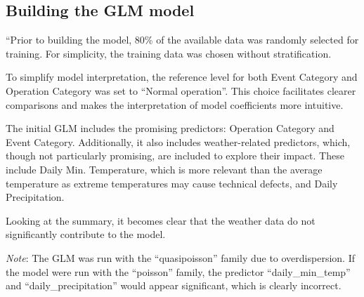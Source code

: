 \documentclass[
]{article}
\newenvironment{Shaded}{\begin{snugshade}}{\end{snugshade}}
\newcommand{\AttributeTok}[1]{\textcolor[rgb]{0.13,0.29,0.53}{#1}}
\newcommand{\CommentTok}[1]{\textcolor[rgb]{0.56,0.35,0.01}{\textit{#1}}}
\newcommand{\FunctionTok}[1]{\textcolor[rgb]{0.13,0.29,0.53}{\textbf{#1}}}
\newcommand{\NormalTok}[1]{#1}
\newcommand{\OtherTok}[1]{\textcolor[rgb]{0.56,0.35,0.01}{#1}}
\newcommand{\SpecialCharTok}[1]{\textcolor[rgb]{0.81,0.36,0.00}{\textbf{#1}}}
\newcommand{\StringTok}[1]{\textcolor[rgb]{0.31,0.60,0.02}{#1}}
\begin{document}
\subsection{Building the GLM model}\label{building-the-glm-model}

``Prior to building the model, 80\% of the available data was randomly
selected for training. For simplicity, the training data was chosen
without stratification.

To simplify model interpretation, the reference level for both Event
Category and Operation Category was set to ``Normal operation''. This
choice facilitates clearer comparisons and makes the interpretation of
model coefficients more intuitive.

\begin{Shaded}
\end{Shaded}

The initial GLM includes the promising predictors: Operation Category
and Event Category. Additionally, it also includes weather-related
predictors, which, though not particularly promising, are included to
explore their impact. These include Daily Min. Temperature, which is
more relevant than the average temperature as extreme temperatures may
cause technical defects, and Daily Precipitation.

Looking at the summary, it becomes clear that the weather data do not
significantly contribute to the model.

\emph{Note}: The GLM was run with the ``quasipoisson'' family due to
overdispersion. If the model were run with the ``poisson'' family, the
predictor ``daily\_min\_temp'' and ``daily\_precipitation'' would appear
significant, which is clearly incorrect.
\end{document}
